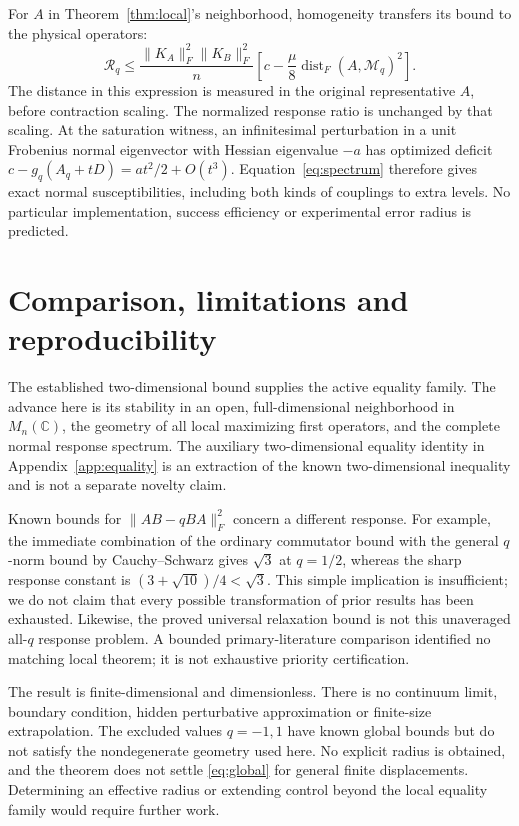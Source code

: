 \documentclass[11pt,a4paper]{article}
\newcommand{\dist}{\operatorname{dist}_F}
\newcommand{\norm}[1]{\lVert #1\rVert_F}
\newcommand{\Mq}{\mathcal M_q}
\begin{document}
For \(A\) in Theorem~\ref{thm:local}'s neighborhood,
homogeneity transfers its bound to the physical operators:
\begin{equation}
 \mathcal R_q\leq
 \frac{\norm{K_A}^2\norm{K_B}^2}{n}
 \left[c-\frac{\mu}{8}\dist(A,\Mq)^2\right].
 \label{eq:physicalbound}
\end{equation}
The distance in this expression is measured in the
original representative \(A\), before contraction scaling.
The normalized response ratio is unchanged by that scaling.
At the saturation witness, an infinitesimal perturbation in
a unit Frobenius normal eigenvector with Hessian eigenvalue
\(-a\) has optimized deficit
\(c-g_q(A_q+tD)=a t^2/2+O(t^3)\).
Equation~\eqref{eq:spectrum} therefore gives exact normal
susceptibilities, including both kinds of couplings to extra levels.
No particular implementation, success efficiency or experimental
error radius is predicted.

\section{Comparison, limitations and reproducibility}
The established two-dimensional bound supplies the active
equality family. The advance here is its stability in an
open, full-dimensional neighborhood in \(M_n(\mathbb C)\),
the geometry of all local maximizing first operators, and
the complete normal response spectrum.
The auxiliary two-dimensional equality identity in
Appendix~\ref{app:equality} is an extraction of the known
two-dimensional inequality and is not a separate novelty claim.

Known bounds for \(\norm{AB-qBA}^2\)
\citep{ckos2022norm,nobori2026} concern a different response.
For example, the immediate combination of the ordinary
commutator bound with the general \(q\)-norm bound by
Cauchy--Schwarz gives \(\sqrt3\) at \(q=1/2\),
whereas the sharp response constant is
\((3+\sqrt{10})/4<\sqrt3\).
This simple implication is insufficient; we do not claim
that every possible transformation of prior results has
been exhausted. Likewise, the proved universal relaxation
bound \citep{muratore2024} is not this unaveraged all-\(q\)
response problem. A bounded primary-literature comparison
identified no matching local theorem; it is not exhaustive
priority certification.

The result is finite-dimensional and dimensionless.
There is no continuum limit, boundary condition, hidden
perturbative approximation or finite-size extrapolation.
The excluded values \(q=-1,1\) have known global bounds
but do not satisfy the nondegenerate geometry used here.
No explicit radius is obtained, and the theorem does not
settle \eqref{eq:global} for general finite displacements.
Determining an effective radius or extending control
beyond the local equality family would require further work.
\end{document}
